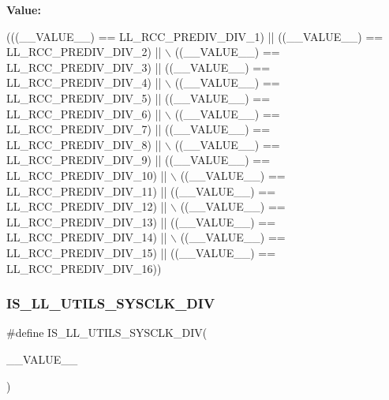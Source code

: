 {\bfseries Value\+:}
\begin{DoxyCode}
(((\_\_VALUE\_\_) == LL\_RCC\_PREDIV\_DIV\_1)  || ((\_\_VALUE\_\_) == LL\_RCC\_PREDIV\_DIV\_2)   || \(\backslash\)
                                             ((\_\_VALUE\_\_) == LL\_RCC\_PREDIV\_DIV\_3)  || ((\_\_VALUE\_\_) == 
      LL\_RCC\_PREDIV\_DIV\_4)   || \(\backslash\)
                                             ((\_\_VALUE\_\_) == LL\_RCC\_PREDIV\_DIV\_5)  || ((\_\_VALUE\_\_) == 
      LL\_RCC\_PREDIV\_DIV\_6)   || \(\backslash\)
                                             ((\_\_VALUE\_\_) == LL\_RCC\_PREDIV\_DIV\_7)  || ((\_\_VALUE\_\_) == 
      LL\_RCC\_PREDIV\_DIV\_8)   || \(\backslash\)
                                             ((\_\_VALUE\_\_) == LL\_RCC\_PREDIV\_DIV\_9)  || ((\_\_VALUE\_\_) == 
      LL\_RCC\_PREDIV\_DIV\_10)  || \(\backslash\)
                                             ((\_\_VALUE\_\_) == LL\_RCC\_PREDIV\_DIV\_11) || ((\_\_VALUE\_\_) == 
      LL\_RCC\_PREDIV\_DIV\_12)  || \(\backslash\)
                                             ((\_\_VALUE\_\_) == LL\_RCC\_PREDIV\_DIV\_13) || ((\_\_VALUE\_\_) == 
      LL\_RCC\_PREDIV\_DIV\_14)  || \(\backslash\)
                                             ((\_\_VALUE\_\_) == LL\_RCC\_PREDIV\_DIV\_15) || ((\_\_VALUE\_\_) == 
      LL\_RCC\_PREDIV\_DIV\_16))
\end{DoxyCode}
\mbox{\label{group___u_t_i_l_s___l_l___private___macros_ga7ec625ff40cf96c750c2658bb1edc8af}} 
\subsubsection{\texorpdfstring{I\+S\+\_\+\+L\+L\+\_\+\+U\+T\+I\+L\+S\+\_\+\+S\+Y\+S\+C\+L\+K\+\_\+\+D\+IV}{IS\_LL\_UTILS\_SYSCLK\_DIV}}
{\footnotesize\ttfamily \#define I\+S\+\_\+\+L\+L\+\_\+\+U\+T\+I\+L\+S\+\_\+\+S\+Y\+S\+C\+L\+K\+\_\+\+D\+IV(\begin{DoxyParamCaption}\item[{}]{\+\_\+\+\_\+\+V\+A\+L\+U\+E\+\_\+\+\_\+ }\end{DoxyParamCaption})}

